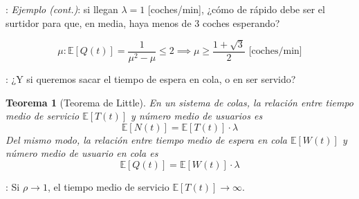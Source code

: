 \documentclass[xcolor={x11names}]{beamer}
\newtheorem{thm}{Teorema}[section] %
\begin{document}
\begin{frame}{\secname: \subsecname}
    \textit{Ejemplo (cont.)}:
    si llegan $\lambda=1$ [coches/min],
    ¿cómo de rápido debe ser el surtidor
    para que, en media,
    haya menos de 3 coches esperando?

    \begin{equation}
        \mu: \mathbb{E}[Q(t)] = \frac{1}{\mu^2-\mu}\leq 2 \implies \mu\geq \frac{1+\sqrt{3}}{2}\text{ [coches/min]}
    \end{equation}


    \begin{figure}
        
    \end{figure}
\end{frame}






\begin{frame}{\secname: \subsecname}
    ¿Y si queremos sacar el tiempo 
    de espera en cola, o en ser servido?
    \pause

    \begin{thm}[Teorema de Little]
        En un sistema de colas,
        la relación entre tiempo medio
        de servicio $\mathbb{E}[T(t)]$
        y número medio de usuarios es
        \begin{equation}
            \mathbb{E}[N(t)] =
            \mathbb{E}[T(t)]\cdot \lambda
        \end{equation}
        Del mismo modo, la relación
        entre tiempo medio de espera
        en cola $\mathbb{E}[W(t)]$ y
        número medio de usuario en cola es
        \begin{equation}
            \mathbb{E}[Q(t)] =
            \mathbb{E}[W(t)]\cdot \lambda
        \end{equation}
    \end{thm}
\end{frame}



\begin{frame}{\secname: \subsecname}
    Si $\rho\to1$, el tiempo medio de servicio
    $\mathbb{E}[T(t)]\to\infty$.

    \vfill

    \begin{figure}
        
    \end{figure}

\end{frame}
\end{document}
